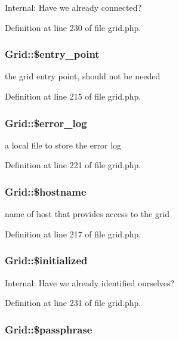Internal: Have we already connected? 



Definition at line 230 of file grid.php.
\subsubsection{\setlength{\rightskip}{0pt plus 5cm}Grid::\$entry\_\-point}\label{classGrid_o0}


the grid entry point, should not be needed 



Definition at line 215 of file grid.php.
\subsubsection{\setlength{\rightskip}{0pt plus 5cm}Grid::\$error\_\-log}\label{classGrid_o6}


a local file to store the error log 



Definition at line 221 of file grid.php.
\subsubsection{\setlength{\rightskip}{0pt plus 5cm}Grid::\$hostname}\label{classGrid_o2}


name of host that provides access to the grid 



Definition at line 217 of file grid.php.
\subsubsection{\setlength{\rightskip}{0pt plus 5cm}Grid::\$initialized}\label{classGrid_o11}


Internal: Have we already identified ourselves? 



Definition at line 231 of file grid.php.
\subsubsection{\setlength{\rightskip}{0pt plus 5cm}Grid::\$passphrase}\label{classGrid_o4}


